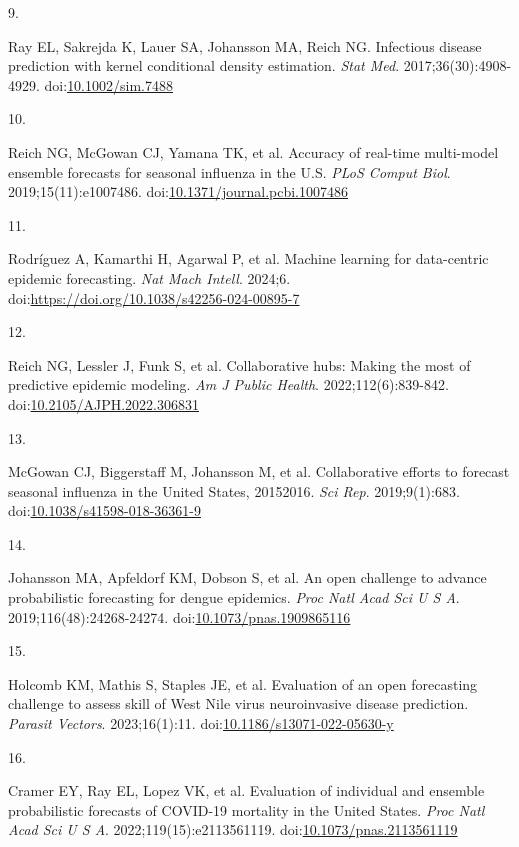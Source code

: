 \documentclass[
]{article}
\newlength{\cslhangindent}
\newlength{\csllabelwidth}
\newenvironment{CSLReferences}[2] %
 {\begin{list}{}{%
  \setlength{\itemindent}{0pt}
  \setlength{\leftmargin}{0pt}
  \setlength{\parsep}{0pt}
  \ifodd #1
   \setlength{\leftmargin}{\cslhangindent}
   \setlength{\itemindent}{-1\cslhangindent}
  \fi
  \setlength{\itemsep}{#2\baselineskip}}}
 {\end{list}}
\newcommand{\CSLLeftMargin}[1]{\parbox[t]{\csllabelwidth}{\strut#1\strut}}
\newcommand{\CSLRightInline}[1]{\parbox[t]{\linewidth - \csllabelwidth}{\strut#1\strut}}
\begin{document}
\begin{CSLReferences}{0}{1}
\CSLLeftMargin{9. }%
\CSLRightInline{Ray EL, Sakrejda K, Lauer SA, Johansson MA, Reich NG.
Infectious disease prediction with kernel conditional density
estimation. \emph{Stat Med}. 2017;36(30):4908-4929.
doi:\href{https://doi.org/10.1002/sim.7488}{10.1002/sim.7488}}

\CSLLeftMargin{10. }%
\CSLRightInline{Reich NG, McGowan CJ, Yamana TK, et al. Accuracy of
real-time multi-model ensemble forecasts for seasonal influenza in the
{U}.{S}. \emph{PLoS Comput Biol}. 2019;15(11):e1007486.
doi:\href{https://doi.org/10.1371/journal.pcbi.1007486}{10.1371/journal.pcbi.1007486}}

\CSLLeftMargin{11. }%
\CSLRightInline{Rodríguez A, Kamarthi H, Agarwal P, et al. Machine
learning for data-centric epidemic forecasting. \emph{Nat Mach Intell}.
2024;6. doi:\url{https://doi.org/10.1038/s42256-024-00895-7}}

\CSLLeftMargin{12. }%
\CSLRightInline{Reich NG, Lessler J, Funk S, et al. Collaborative hubs:
Making the most of predictive epidemic modeling. \emph{Am J Public
Health}. 2022;112(6):839-842.
doi:\href{https://doi.org/10.2105/AJPH.2022.306831}{10.2105/AJPH.2022.306831}}

\CSLLeftMargin{13. }%
\CSLRightInline{McGowan CJ, Biggerstaff M, Johansson M, et al.
Collaborative efforts to forecast seasonal influenza in the United
States, 2015{\textendash}2016. \emph{Sci Rep}. 2019;9(1):683.
doi:\href{https://doi.org/10.1038/s41598-018-36361-9}{10.1038/s41598-018-36361-9}}

\CSLLeftMargin{14. }%
\CSLRightInline{Johansson MA, Apfeldorf KM, Dobson S, et al. An open
challenge to advance probabilistic forecasting for dengue epidemics.
\emph{Proc Natl Acad Sci U S A}. 2019;116(48):24268-24274.
doi:\href{https://doi.org/10.1073/pnas.1909865116}{10.1073/pnas.1909865116}}

\CSLLeftMargin{15. }%
\CSLRightInline{Holcomb KM, Mathis S, Staples JE, et al. Evaluation of
an open forecasting challenge to assess skill of {West} {Nile} virus
neuroinvasive disease prediction. \emph{Parasit Vectors}. 2023;16(1):11.
doi:\href{https://doi.org/10.1186/s13071-022-05630-y}{10.1186/s13071-022-05630-y}}

\CSLLeftMargin{16. }%
\CSLRightInline{Cramer EY, Ray EL, Lopez VK, et al. Evaluation of
individual and ensemble probabilistic forecasts of COVID-19 mortality in
the {United States}. \emph{Proc Natl Acad Sci U S A}.
2022;119(15):e2113561119.
doi:\href{https://doi.org/10.1073/pnas.2113561119}{10.1073/pnas.2113561119}}


\end{CSLReferences}
\end{document}
